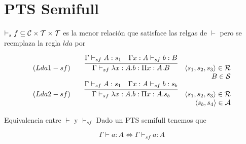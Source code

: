 \section{PTS Semifull}

\begin{definition}[$\vdash_sf$]

$\vdash_sf \subseteq \mathcal{C}\times\mathcal{T}\times\mathcal{T}$ es la menor relación que satisface las relgas de $\vdash$ pero
se reemplaza la regla $lda$ por

\[
\begin{array}{llcr}
	(Lda1-sf) & &\infer{\Gamma \vdash_{sf} \lambda x:A.b : \Pi x:A.B}{\Gamma \vdash_{sf} A:s_1& \Gamma x:A \vdash_{sf} b : B} & \langle s_1,s_2,s_3 \rangle \in \cR  \\  
	          & &                                                                                                             & B \in \cS  \\ 
	(Lda2-sf) & &\infer{\Gamma \vdash_{sf} \lambda x:A.b : \Pi x:A.s_b}{\Gamma \vdash_{sf} A:s_1& \Gamma x:A \vdash_{sf} b : s_b} & \langle s_1,s_2,s_3 \rangle \in \cR \\ 
	          & &                                                                                                             & \langle s_b, s_4 \rangle \in \cA  \\ 
	

	
\end{array}
\]


\end{definition}

\begin{lemma}{Equivalencia entre $\vdash$ y $\vdash_{sf}$}
Dado un PTS semifull tenemos que

\begin{equation}
\Gamma \vdash a : A \Leftrightarrow \Gamma \vdash_{sf} a: A
\end{equation}

\end{lemma}



